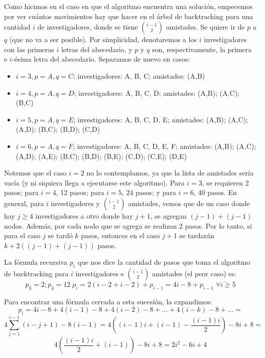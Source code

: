 \documentclass[12pt, a4paper,english,spanish]{article}
\begin{document}
\begin{itemize}
Como hicimos en el caso en que el algoritmo encuentra una soluci\'on, empecemos por ver cu\'antos movimientos hay que hacer en el \'arbol de backtracking para una cantidad $i$ de investigadores, donde se tiene $\binom{i-1}{2}$ amistades. Se quiere ir de $p$ a $q$ (que no va a ser posible). Por simplicidad, denotaremos a los $i$ investigadores con las primeras $i$ letras del abecedario, y $p$ y $q$ son, respectivamente, la primera e $i$-\'esima letra del abecedario. Separamos de nuevo en casos:

\begin{itemize}
\item $i=3, p=A, q=C$; investigadores: A, B, C; amistades: (A,B)
\item $i=4, p=A, q=D$; investigadores: A, B, C, D; amistades: (A,B); (A,C); (B,C)
\item $i=5, p=A, q=E$; investigadores: A, B, C, D, E; amistades: (A,B); (A,C); (A,D); (B,C); (B,D); (C,D)
\item $i=6, p=A, q=F$; investigadores: A, B, C, D, E, F; amistades: (A,B); (A,C); (A,D); (A,E); (B,C); (B,D); (B,E); (C,D); (C,E); (D,E)
\end{itemize}   



Notemos que el caso $i=2$ no lo contemplamos, ya que la lista de amistades ser\'ia vac\'ia (y ni siquiera llega a ejecutarse este algoritmo). Para $i=3$, se requieren 2 pasos; para $i=4$, 12 pasos; para $i=5$, 24 pasos; y para $i=6$, 40 pasos. En general, para $i$ investigadores y $\binom{i-1}{2}$ amistades, vemos que de un caso donde hay $j \geq 4$ investigadores a otro donde hay $j+1$, se agregan $(j-1)+(j-1)$ nodos. Adem\'as, por cada nodo que se agrega se realizan 2 pasos. Por lo tanto, si para el caso $j$ se tard\'o $k$ pasos, entonces en el caso $j+1$ se tardar\'an $k+2((j-1)+(j-1))$ pasos. 

La f\'ormula recursiva $p_i$ que nos dice la cantidad de pasos que toma el algoritmo de backtracking para $i$ investigadores e $\binom{i-1}{2}$ amistades (el peor caso) es: $$p_3 = 2; p_4 = 12 \; p_i = 2(i-2+i-2) + p_{i-1} = 4i-8+p_{i-1} \; \forall i \geq 5 $$

Para encontrar una f\'ormula cerrada a esta sucesi\'on, la expandimos: $$p_i = 4i-8 + 4(i-1)-8 + 4(i-2)-8 + \ldots + 4(i-k)-8 + \ldots =$$ $$4 \sum_{j=1}^{i-1} (i-j+1) - 8(i-1) = 4 \left((i-1)i + (i-1) - \frac{(i-1)i}{2}\right) - 8i + 8 =$$ $$4\left(\frac{(i-1)i}{2}+(i-1)\right) - 8i + 8 = 2i^2-6i+4$$


\end{itemize}
\end{document}
